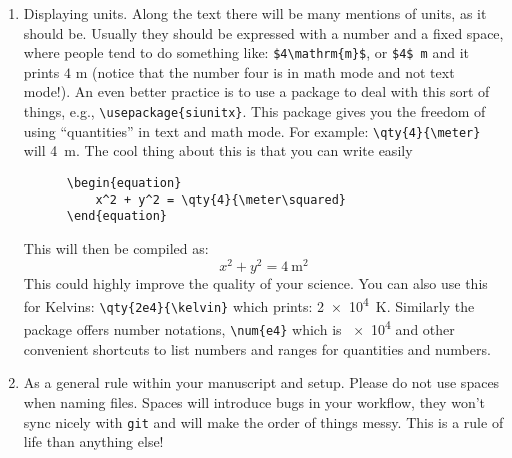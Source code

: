 \begin{enumerate}
  \item Displaying units. Along the text there will be many mentions of units, as it should be. Usually they should be expressed with a number and a fixed space, where people tend to do something like: \verb|$4\mathrm{m}$|, or \verb|$4$ m| and it prints $4$ m (notice that the number four is in math mode and not text mode!). An even better practice is to use a package to deal with this sort of things, e.g., \verb|\usepackage{siunitx}|. This package gives you the freedom of using ``quantities'' in text and math mode. For example: \verb|\qty{4}{\meter}| will \qty{4}{\m}. The cool thing about this is that you can write easily
  \begin{verbatim}
      \begin{equation}
          x^2 + y^2 = \qty{4}{\meter\squared}
      \end{equation}
  \end{verbatim}

  This will then be compiled as:
  \begin{equation}
    x^2 + y^2 = \qty{4}{\meter\squared}
  \end{equation}
  This could highly improve the quality of your science. You can also use this for Kelvins: \verb|\qty{2e4}{\kelvin}| which prints: \qty{2e4}{\kelvin}. Similarly the package offers number notations, \verb|\num{e4}| which is \num{e4} and other convenient shortcuts to list numbers and ranges for quantities and numbers. 


  \item As a general rule within your manuscript and setup. Please do not use spaces when naming files. Spaces will introduce bugs in your workflow, they won't sync nicely with \texttt{git} and will make the order of things messy. This is a rule of life than anything else!
  
  
\end{enumerate}


